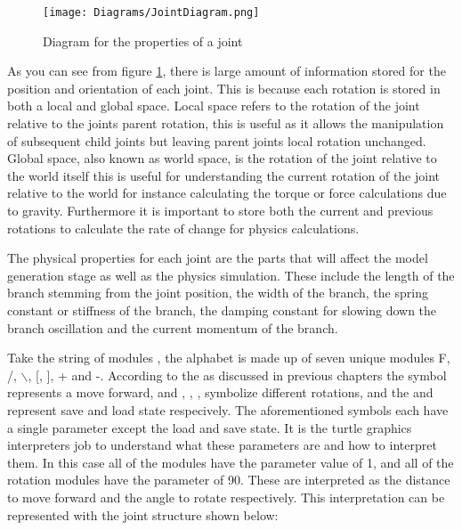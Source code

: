 \begin{figure}[htbp]
	{\centering
		\vspace{7px}
		\texttt{[image: Diagrams/JointDiagram.png]}
		\caption{Diagram for the properties of a joint} \label{joint properties}
	}
\end{figure}

\noindent
As you can see from figure \ref{joint properties}, there is large amount of information stored for the position and orientation of each joint. This is because each rotation is stored in both a local and global space. Local space refers to the rotation of the joint relative to the joints parent rotation, this is useful as it allows the manipulation of subsequent child joints but leaving parent joints local rotation unchanged. Global space, also known as world space, is the rotation of the joint relative to the world itself this is useful for understanding the current rotation of the joint relative to the world for instance calculating the torque or force calculations due to gravity. Furthermore it is important to store both the current and previous rotations to calculate the rate of change for physics calculations.

The physical properties for each joint are the parts that will affect the model generation stage as well as the physics simulation. These include the length of the branch stemming from the joint position, the width of the branch, the spring constant or stiffness of the branch, the damping constant for slowing down the branch oscillation and the current momentum of the branch. 

Take the string of modules , the alphabet is made up of seven unique modules F, /, $\backslash$, [, ], + and -. According to the as discussed in previous chapters the  symbol represents a move forward, and \say{+}, \say{-}, \say{/}, \say{$\backslash$} symbolize different rotations, and the \say{[} and \say{]} represent save and load state respecively. The aforementioned symbols each have a single parameter except the load and save state. It is the turtle graphics interpreters job to understand what these parameters are and how to interpret them. In this case all of the  modules have the parameter value of 1, and all of the rotation modules have the parameter of 90. These are interpreted as the distance to move forward and the angle to rotate respectively. This interpretation can be represented with the joint structure shown below:

